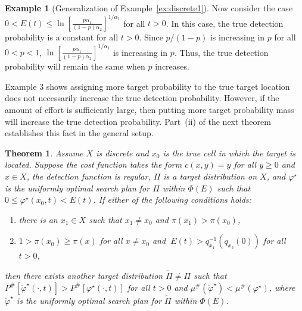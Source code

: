 \documentclass[12pt]{article}
\newtheorem{theorem}{Theorem}[section]
\theoremstyle{plain}
\theoremstyle{definition}
\newtheorem{example}{Example}%
\theoremstyle{remark}
\begin{document}
\begin{example}[Generalization of Example~\ref{ex:discrete1}]
Now consider the case $0<E(t)\leq \ln \left[\frac{p\alpha_1}{(1-p)\alpha_2}\right]^{1/\alpha_1}$ for all $t>0$. In this case,   the true detection probability is a constant for all $t>0$.  Since $p/(1-p)$ is increasing  in $p$ for all $0<p<1$, $\ln \left[\frac{p\alpha_1}{(1-p)\alpha_2}\right]^{1/\alpha_1}$ is increasing in $p$. Thus,   the true detection probability will remain the same when  $p$ increases.

\end{example}

Example 3 shows assigning more target probability to the true target location does not necessarily increase the true detection probability.  However, if the amount of effort is sufficiently large,  then putting more target probability mass will increase the true detection probability.  Part~(ii) of the next theorem establishes this fact in the general setup. 


\begin{theorem}
\label{thm:nooptdiscrete1}
Assume $X$ is discrete and $x_0$ is the true cell in which the target is located.  Suppose the cost function takes the form $c(x,y)=y$ for all $y\geq 0$ and $x \in X$,  the detection function is regular,  $\Pi$ is a target distribution on $X$, and $\varphi^\star$ is the uniformly optimal search plan for $\Pi$ within $\Phi(E)$ such that $0\leq \varphi^\star(x_0, t)<E(t)$.  If either of the following conditions holds:
\begin{enumerate}
\item[(i)]there is an $x_1\in X$ such that $x_1\neq x_0$ and $\pi(x_1)>\pi(x_0)$, 
\item[(ii)]$1>\pi(x_0)\geq \pi(x)$ for all $x\neq  x_0$ and  $\ E(t)>q_{x_1}^{-1}(q_{x_2}(0))$ for all $t>0$,
\end{enumerate}
then there exists another target distribution $\widetilde{\Pi}\neq \Pi$ such that $P^{\#}[\widetilde{\varphi}^\star(\cdot, t)]>P^{\#}[\varphi^\star(\cdot, t)]$ for all $t>0$ and $\mu^{\#}(\widetilde{\varphi}^\star)<\mu^{\#}(\varphi^\star)$, where $\widetilde{\varphi}^\star$ is the uniformly optimal search plan for $\widetilde{\Pi}$ within $\Phi(E)$.
\end{theorem}
\end{document}
